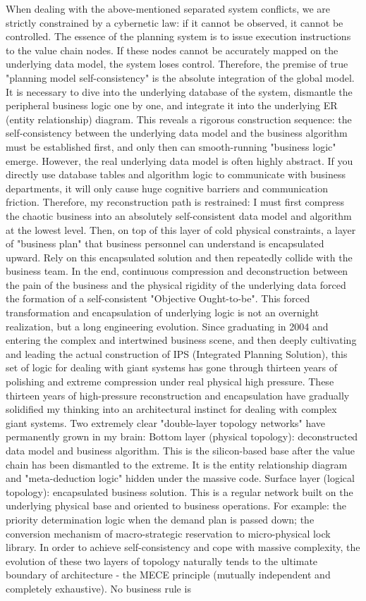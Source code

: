 \documentclass[11pt,a4paper]{article}
\begin{document}
When dealing with the above-mentioned separated system conflicts, we are strictly constrained by a cybernetic law: if it cannot be observed, it cannot be controlled. The essence of the planning system is to issue execution instructions to the value chain nodes. If these nodes cannot be accurately mapped on the underlying data model, the system loses control. Therefore, the premise of true "planning model self-consistency" is the absolute integration of the global model. It is necessary to dive into the underlying database of the system, dismantle the peripheral business logic one by one, and integrate it into the underlying ER (entity relationship) diagram. This reveals a rigorous construction sequence: the self-consistency between the underlying data model and the business algorithm must be established first, and only then can smooth-running "business logic" emerge. However, the real underlying data model is often highly abstract. If you directly use database tables and algorithm logic to communicate with business departments, it will only cause huge cognitive barriers and communication friction. Therefore, my reconstruction path is restrained: I must first compress the chaotic business into an absolutely self-consistent data model and algorithm at the lowest level. Then, on top of this layer of cold physical constraints, a layer of "business plan" that business personnel can understand is encapsulated upward. Rely on this encapsulated solution and then repeatedly collide with the business team. In the end, continuous compression and deconstruction between the pain of the business and the physical rigidity of the underlying data forced the formation of a self-consistent "Objective Ought-to-be". This forced transformation and encapsulation of underlying logic is not an overnight realization, but a long engineering evolution. Since graduating in 2004 and entering the complex and intertwined business scene, and then deeply cultivating and leading the actual construction of IPS (Integrated Planning Solution), this set of logic for dealing with giant systems has gone through thirteen years of polishing and extreme compression under real physical high pressure. These thirteen years of high-pressure reconstruction and encapsulation have gradually solidified my thinking into an architectural instinct for dealing with complex giant systems. Two extremely clear "double-layer topology networks" have permanently grown in my brain: Bottom layer (physical topology): deconstructed data model and business algorithm. This is the silicon-based base after the value chain has been dismantled to the extreme. It is the entity relationship diagram and "meta-deduction logic" hidden under the massive code. Surface layer (logical topology): encapsulated business solution. This is a regular network built on the underlying physical base and oriented to business operations. For example: the priority determination logic when the demand plan is passed down; the conversion mechanism of macro-strategic reservation to micro-physical lock library. In order to achieve self-consistency and cope with massive complexity, the evolution of these two layers of topology naturally tends to the ultimate boundary of architecture - the MECE principle (mutually independent and completely exhaustive). No business rule is 
\end{document}
